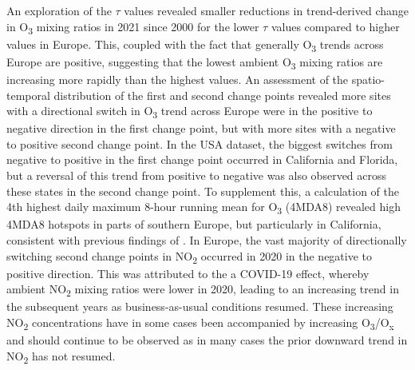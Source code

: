 \documentclass[journal abbreviation, manuscript]{copernicus}
\begin{document}
An exploration of the $\tau$ values revealed smaller reductions in trend-derived change in O\textsubscript{3} mixing ratios in 2021 since 2000 for the lower $\tau$ values compared to higher values in Europe. This, coupled with the fact that generally O\textsubscript{3} trends across Europe are positive, suggesting that the lowest ambient O\textsubscript{3} mixing ratios are increasing more rapidly than the highest values.
An assessment of the spatio-temporal distribution of the first and second change points revealed more sites with a directional switch in O\textsubscript{3} trend across Europe were in the positive to negative direction in the first change point, but with more sites with a negative to positive second change point. In the USA dataset, the biggest switches from negative to positive in the first change point occurred in California and Florida, but a reversal of this trend from positive to negative was also observed across these states in the second change point. To supplement this, a calculation of the 4th highest daily maximum 8-hour running mean for O\textsubscript{3} (4MDA8) revealed high 4MDA8 hotspots in parts of southern Europe, but particularly in California, consistent with previous findings of \cite{fleming_2018}. In Europe, the vast majority of directionally switching second change points in NO\textsubscript{2} occurred in 2020 in the negative to positive direction. This was attributed to the a COVID-19 effect, whereby ambient NO\textsubscript{2} mixing ratios were lower in 2020, leading to an increasing trend in the subsequent years as business-as-usual conditions resumed. These increasing NO\textsubscript{2} concentrations have in some cases been accompanied by increasing O\textsubscript{3}/O\textsubscript{x} and should continue to be observed as in many cases the prior downward trend in NO\textsubscript{2} has not resumed. 

\clearpage






\end{document}
